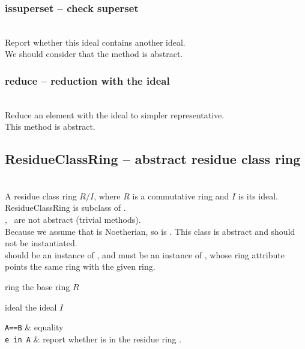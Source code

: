   \subsubsection{issuperset -- check superset}
   \\
   \spacing
   \quad Report whether this ideal contains another ideal.\\
   \spacing
   We should consider that the method is abstract.\\
   \spacing
  \subsubsection{reduce -- reduction with the ideal}
  \\
   \spacing
   \quad Reduce an element with the ideal to simpler representative.\\
   \spacing
   This method is abstract.\\
   \spacing
\C

\subsection{\negok ResidueClassRing -- abstract residue class ring}
  \initialize
  \\
  \spacing
  \quad A residue class ring $R/I$, where $R$ is a commutative ring and $I$ is its ideal.
  \spacing
  \quad   ResidueClassRing is subclass of .\\
  ,\  are not abstract (trivial methods).\\
  Because we assume that  is Noetherian, so is .
  \spacing
  \quad  This class is abstract and should not be instantiated.\\
   should be an instance of ,
  and  must be an instance of ,
  whose ring attribute points the same ring with the given ring.
 \begin{at}
    \item[ring] the base ring $R$\\
    \item[ideal] the ideal $I$\\
  \end{at}
  \begin{op}
     \verb+A==B+ & equality\\
    \verb+e in A+ &  report whether  is in the residue ring .\\
  \end{op}
\C

